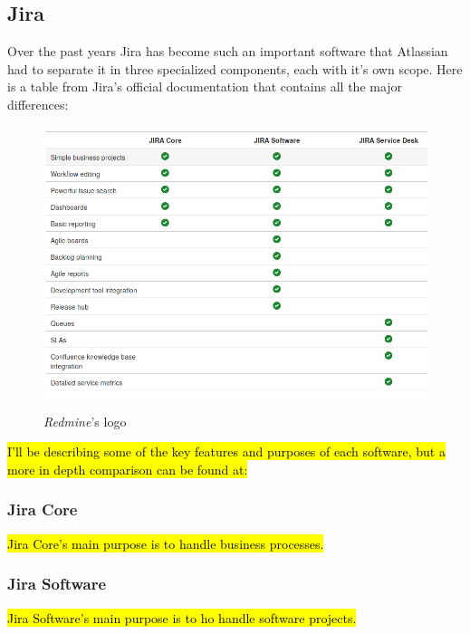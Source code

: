 	\subsection{Jira}
		Over the past years Jira has become such an important software that Atlassian had to separate it in three specialized components, each with it's own scope.
		Here is a table from Jira's official documentation that contains all the major differences:
		\begin{figure}[H]
			\centering
			\includegraphics[width=\textwidth]{resources/jira_type}\\
			\caption{\textit{Redmine}'s logo}
		\end{figure}
		\hl{I'll be describing some of the key features and purposes of each software, but a more in depth comparison can be found at:}
		
		\subsubsection{Jira Core}
			\hl{Jira Core's main purpose is to handle business processes.}
			
		\subsubsection{Jira Software}
			\hl{Jira Software's main purpose is to ho handle software projects.}
		
